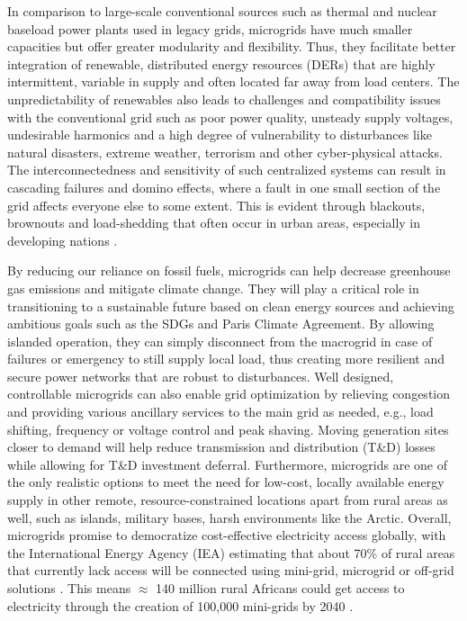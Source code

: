 \documentclass[final,3p,times]{elsarticle}
\begin{document}
In comparison to large-scale conventional sources such as thermal and nuclear baseload power plants used in legacy grids, microgrids have much smaller capacities but offer greater modularity and flexibility. Thus, they facilitate better integration of renewable, distributed energy resources (DERs) that are highly intermittent, variable in supply and often located far away from load centers. The unpredictability of renewables also leads to challenges and compatibility issues with the conventional grid such as poor power quality, unsteady supply voltages, undesirable harmonics and a high degree of vulnerability to disturbances like natural disasters, extreme weather, terrorism and other cyber-physical attacks. The interconnectedness and sensitivity of such centralized systems can result in cascading failures and domino effects, where a fault in one small section of the grid affects everyone else to some extent. This is evident through blackouts, brownouts and load-shedding that often occur in urban areas, especially in developing nations \cite{macrogrid_prob}. 

By reducing our reliance on fossil fuels, microgrids can help decrease greenhouse gas emissions and mitigate climate change. They will play a critical role in transitioning to a sustainable future based on clean energy sources and achieving ambitious goals such as the SDGs and Paris Climate Agreement. By allowing islanded operation, they can simply disconnect from the macrogrid in case of failures or emergency to still supply local load, thus creating more resilient and secure power networks that are robust to disturbances. Well designed, controllable microgrids can also enable grid optimization by relieving congestion and providing various ancillary services to the main grid as needed, e.g., load shifting, frequency or voltage control and peak shaving. Moving generation sites closer to demand will help reduce transmission and distribution (T\&D) losses while allowing for T\&D investment deferral. Furthermore, microgrids are one of the only realistic options to meet the need for low-cost, locally available energy supply in other remote, resource-constrained locations apart from rural areas as well, such as islands, military bases, harsh environments like the Arctic. Overall, microgrids promise to democratize cost-effective electricity access globally, with the International Energy Agency (IEA) estimating that about 70\% of rural areas that currently lack access will be connected using mini-grid, microgrid or off-grid solutions \cite{WEO_2018,mentis}. This means $\approx$ 140 million rural Africans could get access to electricity through the creation of 100,000 mini-grids by 2040 \cite{wri}.
\end{document}
